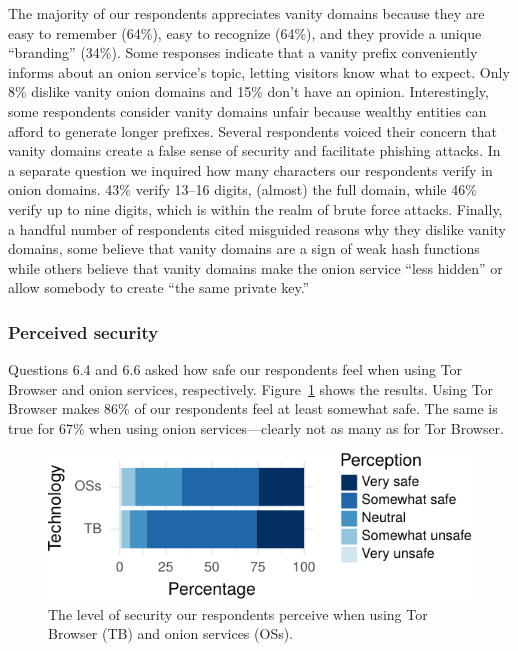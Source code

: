 The majority of our respondents appreciates vanity domains because they are easy
to remember (64\%), easy to recognize (64\%), and they provide a unique
``branding'' (34\%).  Some responses indicate that a vanity prefix conveniently
informs about an onion service's topic, letting visitors know what to expect.
Only 8\% dislike vanity onion domains and 15\% don't have an opinion.
Interestingly, some respondents consider vanity domains unfair because wealthy
entities can afford to generate longer prefixes.  Several respondents voiced
their concern that vanity domains create a false sense of security and
facilitate phishing attacks.  In a separate question we inquired how many
characters our respondents verify in onion domains.  43\% verify 13--16 digits,
\ie (almost) the full domain, while 46\% verify up to nine digits, which is
within the realm of brute force attacks.  Finally, a handful number of
respondents cited misguided reasons why they dislike vanity domains, \eg some
believe that vanity domains are a sign of weak hash functions while others
believe that vanity domains make the onion service ``less hidden'' or allow
somebody to create ``the same private key.''

\subsubsection{Perceived security}

Questions 6.4 and 6.6 asked how safe our respondents feel when using Tor Browser
and onion services, respectively.  Figure~\ref{fig:perceived-security} shows the
results.  Using Tor Browser makes 86\% of our respondents feel at least somewhat
safe.  The same is true for 67\% when using onion services---clearly not as many
as for Tor Browser.

\begin{figure}[t]
    \centering
    \includegraphics[width=\linewidth]{figures/perceived-security.pdf}
    \caption{The level of security our respondents perceive when using Tor
    Browser (TB) and onion services (OSs).}
    \label{fig:perceived-security}
\end{figure}

